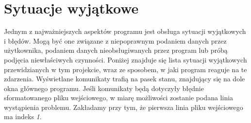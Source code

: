 \documentclass[a4paper,12pt]{article}
\newcommand\tab[1][0.6cm]{\hspace*{#1} }
\begin{document}
\section{Sytuacje wyjątkowe}

\tab Jednym z najważniejszych aspektów programu jest obsługa sytuacji wyjątkowych i błędów. Mogą być one związane z niepoprawnym podaniem danych przez użytkownika, podaniem danych nieobsługiwanych przez program lub próbą podjęcia niewłaściwych czynności. Poniżej znajduje się lista sytuacji wyjątkowych przewidzianych w tym projekcie, wraz ze sposobem, w jaki program reaguje na te zdarzenia. Wyświetlane komunikaty trafią na pasek stanu, znajdujący się na dole okna głównego programu. Jeśli komunikaty będą dotyczyły błędnie sformatowanego pliku wejściowego, w miarę możliwości zostanie podana linia wystąpienia problemu. Zakładamy przy tym, że pierwsza linia pliku wejściowego ma indeks \textit{1}.
\end{document}
